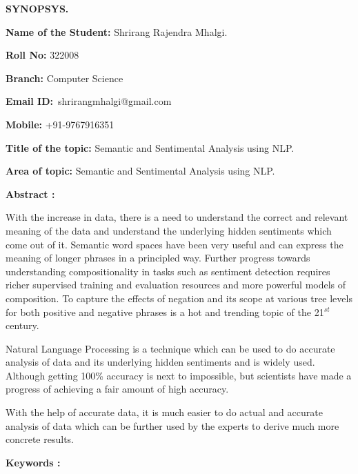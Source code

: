 \documentclass{article} %
\begin{document}


\noindent \textbf{}

\noindent \textbf{\eject }

\noindent \textbf{SYNOPSYS.}

\noindent \textbf{}

\noindent \textbf{Name of the Student:} Shrirang Rajendra Mhalgi.

\noindent \textbf{Roll No:} 322008

\noindent \textbf{Branch:} Computer Science

\noindent \textbf{Email ID:}~shrirangmhalgi@gmail.com

\noindent \textbf{Mobile:} +91-9767916351

\noindent \textbf{Title of the topic:} Semantic and Sentimental Analysis using NLP.

\noindent \textbf{Area of topic:} Semantic and Sentimental Analysis using NLP.

\noindent 

\noindent 

\noindent \textbf{Abstract : }

With the increase in data, there is a need to understand the correct and relevant meaning of the data and understand the underlying hidden sentiments which come out of it. Semantic word spaces have been very useful and can express the meaning of longer phrases in a principled way. Further progress towards understanding compositionality in tasks such as sentiment detection requires richer supervised training and evaluation resources and more powerful models of composition. To capture the effects of negation and its scope at various tree levels for both positive and negative phrases is a hot and trending topic of the 21${}^{st}$ century. 

Natural Language Processing is a technique which can be used to do accurate analysis of data and its underlying hidden sentiments and is widely used. Although getting 100\% accuracy is next to impossible, but scientists have made a progress of achieving a fair amount of high accuracy. 

With the help of accurate data, it is much easier to do actual and accurate analysis of data which can be further used by the experts to derive much more concrete results.

\noindent \eject 



\noindent \textbf{Keywords : }
\end{document}
